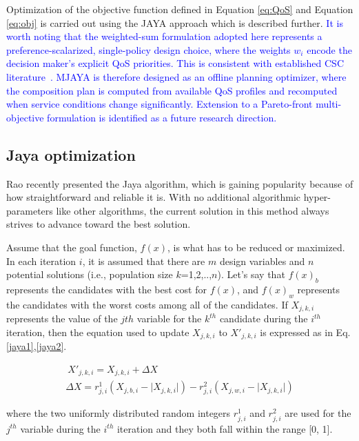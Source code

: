 \documentclass[3p,twocolumn]{elsarticle}
\theoremstyle{thmstyleone}%
\theoremstyle{thmstyletwo}%
\theoremstyle{thmstylethree}%
\begin{document}
Optimization of the objective function defined in Equation \ref{eq:QoS} and Equation \ref{eq:obj} is carried out using the JAYA approach which is described further. \textcolor{blue}{It is worth noting that the weighted-sum formulation adopted here represents a preference-scalarized, single-policy design choice, where the weights $w_i$ encode the decision maker's explicit QoS priorities. This is consistent with established CSC literature~\cite{jatoth2019optimal, gavvala2019qos, 
haytamy2020deep, eisa2020modelling}. MJAYA is therefore designed as an offline planning optimizer, where the composition plan is computed from available QoS profiles and recomputed when service 
conditions change significantly. Extension to a Pareto-front multi-objective formulation is identified as a future research direction.}

\subsection{Jaya optimization}

Rao \cite{rao2016jaya} recently presented the Jaya algorithm, which is gaining popularity because of how straightforward and reliable it is. With no additional algorithmic hyper-parameters like other algorithms, the current solution in this method always strives to advance toward the best solution.

Assume that the goal function, $f(x)$, is what has to be reduced or maximized. In each iteration $i$, it is assumed that there are $m$ design variables and $n$ potential solutions (i.e., population size $k$=1,2,..,$n$). Let's say that $f(x)_b$ represents the candidates with the best cost for $f(x)$, and $f(x)_w$ represents the candidates with the worst costs among all of the candidates. If $X_{j,k,i}$ represents the value of the $jth$ variable for the $k^{th}$ candidate during the $i^{th}$ iteration, then the equation used to update $X_{j,k,i}$ to $X'_{j,k,i}$ is expressed as in Eq. \ref{jaya1},\ref{jaya2}.


\begin{eqnarray}
\label{jaya1}
\ X'_{j,k,i} = X_{j,k,i} + \Delta X  \\
\label{jaya2}
\Delta X = r^1_{j,i} (X_{j,b,i} -  \lvert X_{j,k,i} \rvert) - r^2_{j,i} (X_{j,w,i} -  \lvert X_{j,k,i} \rvert)
\end{eqnarray}

where the two uniformly distributed random integers $r^1_{j, i}$ and $r^2_{j, i}$ are used for the $j^{th}$ variable during the $i^{th}$ iteration and they both fall within the range [0, 1].
\end{document}
